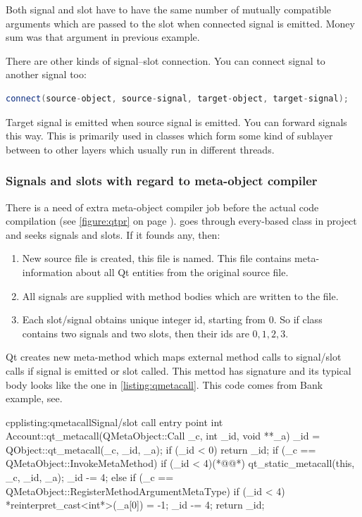 Both signal and slot have to have the same number of mutually compatible arguments which are passed to the slot when connected signal is emitted. Money sum was that argument in previous example.

There are other kinds of signal--slot connection. You can connect signal to another signal too:
\begin{lstlisting}[firstnumber=1,language=cpp]
connect(source-object, source-signal, target-object, target-signal);
\end{lstlisting}
Target signal is emitted when source signal is emitted. You can forward signals this way. This is primarily used in classes which form some kind of sublayer between to other layers which usually run in different threads.

\subsubsection{Signals and slots with regard to meta-object compiler}\label{section:mocfun}
There is a need of extra meta-object compiler job before the actual \cpp code compilation (see \autoref{figure:qtpr} on page \pageref{figure:qtpr}).  goes through every-based class in project and seeks signals and slots. If it founds any, then:
\begin{enumerate}
\item New source file is created, this file is named. This file contains meta-information about all Qt entities from the original source file.
\item All signals are supplied with method bodies which are written to the file.
\item Each slot/signal obtains unique integer id, starting from 0. So if class contains two signals and two slots, then their ids are $0,1,2,3$.
\end{enumerate}

Qt creates new meta-method which maps external method calls to signal/slot calls if signal is emitted or slot called. This mettod has signature and its typical body looks like the one in \autoref{listing:qmetacall}. This code comes from Bank example, see.

\begin{fdoccode}{cpp}{listing:qmetacall}{Signal/slot call entry point}
int Account::qt_metacall(QMetaObject::Call _c, int _id, void **_a)
{
    _id = QObject::qt_metacall(_c, _id, _a);
    if (_id < 0)
        return _id;
    if (_c == QMetaObject::InvokeMetaMethod) {
        if (_id < 4)(*@\label{listing:invoke2}@*)
            qt_static_metacall(this, _c, _id, _a);
        _id -= 4;
    } else if (_c == QMetaObject::RegisterMethodArgumentMetaType) {
        if (_id < 4)
            *reinterpret_cast<int*>(_a[0]) = -1;
        _id -= 4;
    }
    return _id;
}
\end{fdoccode}

